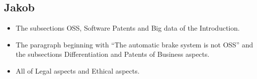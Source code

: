 \documentclass[conference]{IEEEtran}
\begin{document}
\subsection{Jakob}
\begin{itemize}
	\item
	The subsections OSS, Software Patents and Big data of the Introduction.
	\item
	The paragraph beginning with ``The automatic brake system is not OSS'' and the subsections Differentiation and Patents of Business aspects.
	\item
	All of Legal aspects and Ethical aspects.
\end{itemize}
\end{document}
